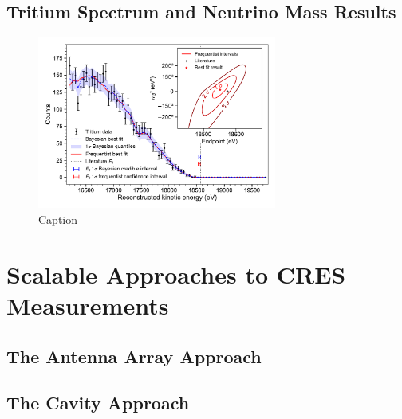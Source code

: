 \subsection{Tritium Spectrum and Neutrino Mass Results}

\begin{figure}
    \centering
    \includegraphics[width=0.7\textwidth]{figs/Chapter-3/12-03-22A_final_E0_real_data_phase_II_tritium_fit_1d.pdf}
    \caption{Caption}
    \label{fig:final_tritium_fit}
\end{figure}

\section{Scalable Approaches to CRES Measurements}
\subsection{The Antenna Array Approach}
\subsection{The Cavity Approach}



